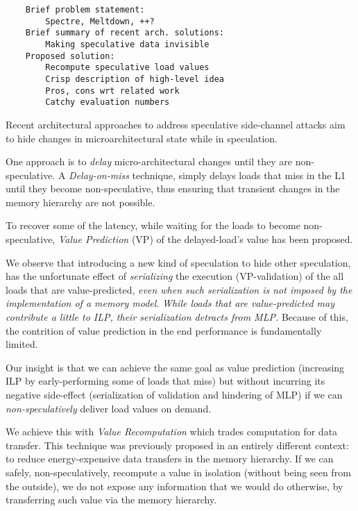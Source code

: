\begin{verbatim}
    Brief problem statement: 
        Spectre, Meltdown, ++?
    Brief summary of recent arch. solutions: 
        Making speculative data invisible
    Proposed solution: 
        Recompute speculative load values
        Crisp description of high-level idea
        Pros, cons wrt related work
        Catchy evaluation numbers
\end{verbatim}

Recent architectural approaches to address speculative side-channel attacks aim to hide changes in microarchitectural state while in speculation. 

One approach is to \emph{delay} micro-architectural changes until they are non-speculative. A \emph{Delay-on-miss} technique, simply delays loads that miss in the L1 until they become non-speculative, thus ensuring that transient changes in the memory hierarchy are not possible.

To recover some of the latency, while waiting for the loads to become non-speculative, \emph{Value Prediction} (VP) of the delayed-load's value has been proposed.

We observe that introducing a new kind of speculation to hide other speculation, has the unfortunate effect of \emph{serializing} the execution (VP-validation) of the all loads that are value-predicted, \emph{even when such serialization is not imposed by the implementation of a memory model}. \emph{While loads that are value-predicted may contribute a little to ILP, their serialization detracts from MLP.} Because of this, the contrition of value prediction in the end performance is fundamentally limited.

Our insight is that we can achieve the same goal as value prediction (increasing ILP by early-performing some of loads that miss) but without incurring its negative side-effect (serialization of validation and hindering of MLP) if we can \emph{non-speculatively} deliver load values on demand. 

We achieve this with \emph{Value Recomputation} which trades computation for data transfer. This technique was previously proposed in an entirely different context: to reduce energy-expensive data transfers in the memory hierarchy. If we can safely, non-speculatively, recompute a value in isolation (without being seen from the outside), we do not expose any information that we would do otherwise, by transferring such value via the memory hierarchy.

